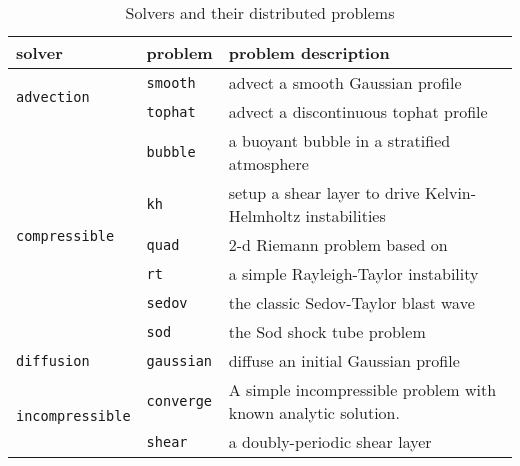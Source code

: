 \begin{table*}[t]
\centering
\renewcommand{\arraystretch}{1.2}
\begin{tabular}{llp{2.5in}}
\hline
{\bf solver} & {\bf problem} & {\bf problem description} \\
\hline
\multirow{2}{*}{\tt advection} & {\tt smooth} & advect a smooth Gaussian profile \\
                               & {\tt tophat} & advect a discontinuous tophat profile \\
\hline
\multirow{6}{*}{\tt compressible} & {\tt bubble} & a buoyant bubble in a stratified atmosphere \\
                                  & {\tt kh} & setup a shear layer to drive Kelvin-Helmholtz instabilities \\
                                  & {\tt quad} & 2-d Riemann problem based on \cite{schulz-rinne:1993}  \\
                                  & {\tt rt}  & a simple Rayleigh-Taylor instability\\
                                  & {\tt sedov} & the classic Sedov-Taylor blast wave \\
                                  & {\tt sod} & the Sod shock tube problem  \\
\hline
{\tt diffusion}& {\tt gaussian} & diffuse an initial Gaussian profile \\
\hline
\multirow{2}{*}{\tt incompressible} & {\tt converge} & A simple incompressible problem with known analytic solution.\
  \\
                     & {\tt shear} & a doubly-periodic shear layer \\
\hline
\end{tabular}
\caption{\label{tab:problems} Solvers and their distributed problems}
\renewcommand{\arraystretch}{1.0}
\end{table*}




